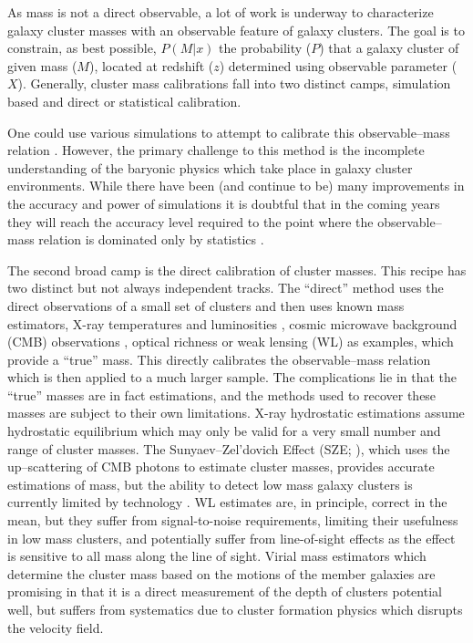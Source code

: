 \documentclass[fleqn,usenatbib]{mnras}
\begin{document}
As mass is not a direct observable, a lot of work is underway to characterize galaxy cluster masses with an observable feature of galaxy clusters. The goal is to constrain, as best possible, $P(M|x)$ the probability ($P$) that a galaxy cluster of given mass ($M$), located at redshift ($z$) determined using observable parameter ($X$). Generally, cluster mass calibrations fall into two distinct camps, simulation based and direct or statistical calibration.

One could use various simulations to attempt to calibrate this observable--mass relation . However, the primary challenge to this method is the incomplete understanding of the baryonic physics which take place in galaxy cluster environments. While there have been (and continue to be) many improvements in the accuracy and power of simulations it is doubtful that in the coming years they will reach the accuracy level required to the point where the observable--mass relation is dominated only by statistics \citep{Weinberg2013}. 
 
The second broad camp is the direct calibration of cluster masses. This recipe has two distinct but not always independent tracks. The ``direct'' method uses the direct observations of a small set of clusters and then uses known mass estimators, X-ray temperatures and luminosities , cosmic microwave background (CMB) observations , optical richness  or weak lensing (WL)  as examples, which provide a ``true'' mass. This directly calibrates the observable--mass relation which is then applied to a much larger sample. The complications lie in that the ``true'' masses are in fact estimations, and the methods used to recover these masses are subject to their own limitations. X-ray hydrostatic estimations assume hydrostatic equilibrium  which may only be valid for a very small number and range of cluster masses. The Sunyaev--Zel'dovich Effect (SZE; \citealt{Sunyaev1972}), which uses the up--scattering of CMB photons to estimate cluster masses, provides accurate estimations of mass, but the ability to detect low mass galaxy clusters is currently limited by technology . WL estimates are, in principle, correct in the mean, but they suffer from signal-to-noise requirements, limiting their usefulness in low mass clusters, and potentially suffer from line-of-sight effects as the effect is sensitive to all mass along the line of sight. Virial mass estimators which determine the cluster mass based on the motions of the member galaxies  are promising in that it is a direct measurement of the depth of clusters potential well, but suffers from systematics due to cluster formation physics which disrupts the velocity field.
 
\end{document}
